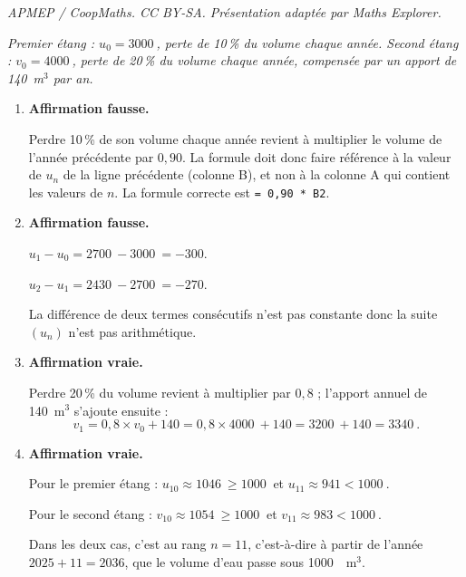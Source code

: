 \documentclass[10pt]{article}
\providecommand{\np}[2][]{{#2~#1}}
\begin{document}
\noindent\textit{APMEP / CoopMaths. CC BY-SA. Présentation adaptée par Maths Explorer.}\par\medskip
\emph{Premier étang : $u_0 = \np{3000}$, perte de 10\,\% du volume chaque année. Second étang :
$v_0 = \np{4000}$, perte de 20\,\% du volume chaque année, compensée par un apport
de 140~m$^3$ par an.}

\begin{enumerate}
	\item \textbf{Affirmation fausse.}

	Perdre 10\,\% de son volume chaque année revient à multiplier le volume de l'année
	précédente par $0,90$. La formule doit donc faire référence à la valeur de $u_n$ de la
	ligne précédente (colonne B), et non à la colonne A qui contient
	les valeurs de $n$. La formule correcte est \texttt{= 0,90 * B2}.

	\item \textbf{Affirmation fausse.}

	 $u_1 - u_0 = \np{2700} - \np{3000} = -300$.

	 $u_2 - u_1 = \np{2430} - \np{2700} =  -270$.

La différence de deux termes consécutifs n'est pas constante donc la suite $(u_n)$ n'est pas arithmétique.

	\item \textbf{Affirmation vraie.}

	Perdre 20\,\% du volume revient à multiplier par $0,8$ ; l'apport annuel de 140~m$^3$
	s'ajoute ensuite :
	\[v_1 = 0,8 \times v_0 + 140 = 0,8 \times \np{4000} + 140 = \np{3200} + 140 = \np{3340}.\]

	\item \textbf{Affirmation vraie.}

	Pour le premier étang : $u_{10} \approx \np{1046} \geqslant \np{1000}$ et
	$u_{11} \approx 941 < \np{1000}$.

	Pour le second étang : $v_{10} \approx \np{1054} \geqslant \np{1000}$
	et $v_{11} \approx 983 < \np{1000}$.

	Dans les deux cas, c'est au rang $n = 11$, c'est-à-dire à partir
	de l'année $2025 + 11 = 2036$, que le volume d'eau passe sous
	\np{1000}~m$^3$.
\end{enumerate}
\end{document}
